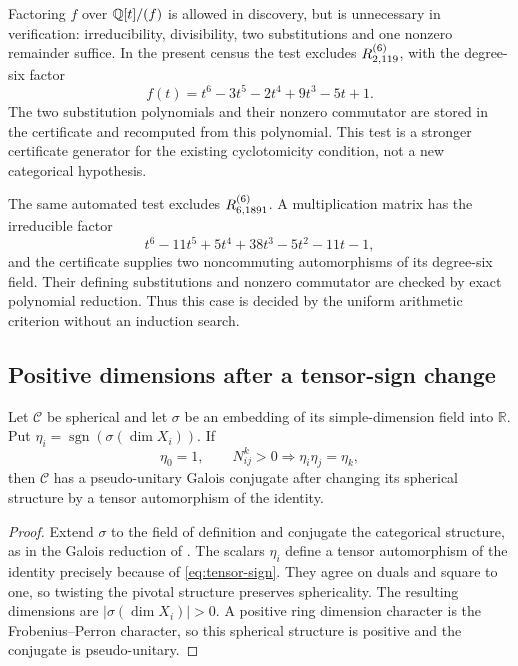 Factoring $f$ over $\mathbb Q[t]/(f)$ is allowed in discovery, but is unnecessary
in verification: irreducibility, divisibility, two substitutions and one
nonzero remainder suffice. In the present census the test excludes
$R^{(6)}_{2,119}$, with the degree-six factor
\[
 f(t)=t^6-3t^5-2t^4+9t^3-5t+1.
\]
The two substitution polynomials and their nonzero commutator are stored
in the certificate and recomputed from this polynomial. This test is a
stronger certificate generator for the existing cyclotomicity condition,
not a new categorical hypothesis.

The same automated test excludes $R^{(6)}_{6,1891}$. A multiplication
matrix has the irreducible factor
\[
 t^6-11t^5+5t^4+38t^3-5t^2-11t-1,
\]
and the certificate supplies two noncommuting automorphisms of its
degree-six field. Their defining substitutions and nonzero commutator
are checked by exact polynomial reduction. Thus this case is decided
by the uniform arithmetic criterion without an induction search.

\subsection{Positive dimensions after a tensor-sign change}
\begin{lemma}\label{lem:positive-sign}
Let $\mathcal C$ be spherical and let $\sigma$ be an embedding of its
simple-dimension field into $\mathbb R$. Put
$\eta_i=\operatorname{sgn}(\sigma(\dim X_i))$. If
\begin{equation}\label{eq:tensor-sign}
 \eta_0=1,\qquad N_{ij}^k>0\Longrightarrow\eta_i\eta_j=\eta_k,
\end{equation}
then $\mathcal C$ has a pseudo-unitary Galois conjugate after changing
its spherical structure by a tensor automorphism of the identity.
\end{lemma}
\begin{proof}
Extend $\sigma$ to the field of definition and conjugate the categorical
structure, as in the Galois reduction of \cite{DP4}. The scalars $\eta_i$
define a tensor automorphism of the identity precisely because of
\eqref{eq:tensor-sign}. They agree on duals and square to one, so twisting
the pivotal structure preserves sphericality. The resulting dimensions
are $|\sigma(\dim X_i)|>0$. A positive ring dimension character is the
Frobenius--Perron character, so this spherical structure is positive and
the conjugate is pseudo-unitary.
\end{proof}

